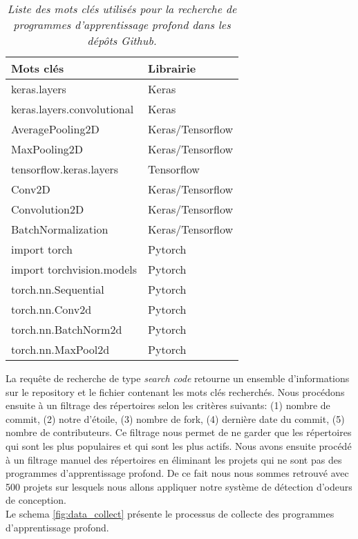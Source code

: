 \begin{table}[h]
  \centering
  \caption{\emph{Liste des mots clés utilisés pour la recherche de programmes d'apprentissage profond dans les dépôts Github.}}
  \label{tab:keywords}
  \begin{tabular}{|l|l|}
    \hline
    \textbf{Mots clés}         & \textbf{Librairie} \\ \hline
    keras.layers               & Keras              \\ \hline
    keras.layers.convolutional & Keras              \\ \hline
    AveragePooling2D           & Keras/Tensorflow   \\ \hline
    MaxPooling2D               & Keras/Tensorflow   \\ \hline
    tensorflow.keras.layers    & Tensorflow         \\ \hline
    Conv2D                     & Keras/Tensorflow   \\ \hline
    Convolution2D              & Keras/Tensorflow   \\ \hline
    BatchNormalization         & Keras/Tensorflow   \\ \hline
    import torch               & Pytorch            \\ \hline
    import torchvision.models  & Pytorch            \\ \hline
    torch.nn.Sequential        & Pytorch            \\ \hline
    torch.nn.Conv2d            & Pytorch            \\ \hline
    torch.nn.BatchNorm2d       & Pytorch            \\ \hline
    torch.nn.MaxPool2d         & Pytorch            \\ \hline
  \end{tabular}
\end{table}


La requête de recherche de type \emph{search code} retourne un ensemble
d'informations sur le repository et le fichier contenant les mots clés
recherchés. Nous procédons ensuite à un filtrage des répertoires selon les
critères suivants: (1) nombre de commit, (2) notre d'étoile, (3) nombre de fork, (4) dernière date du
commit, (5) nombre de contributeurs. Ce filtrage nous permet de ne garder que
les répertoires qui sont les plus populaires et qui sont les plus actifs. Nous
avons ensuite procédé à un filtrage manuel des répertoires en éliminant les
projets qui ne sont pas des programmes d'apprentissage profond. De ce fait nous
nous sommes retrouvé avec 500 projets sur lesquels nous allons appliquer notre
système de détection d'odeurs de conception.\\ Le schema \ref{fig:data_collect} présente le processus de collecte des programmes d'apprentissage profond.\\








